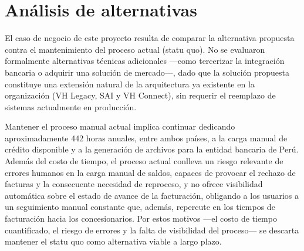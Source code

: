 \section{Análisis de alternativas}

El caso de negocio de este proyecto resulta de comparar la alternativa propuesta contra el mantenimiento del proceso actual (statu quo). No se evaluaron formalmente alternativas técnicas adicionales ---como tercerizar la integración bancaria o adquirir una solución de mercado---, dado que la solución propuesta constituye una extensión natural de la arquitectura ya existente en la organización (VH Legacy, SAI y VH Connect), sin requerir el reemplazo de sistemas actualmente en producción.

Mantener el proceso manual actual implica continuar dedicando aproximadamente 442 horas anuales, entre ambos países, a la carga manual de crédito disponible y a la generación de archivos para la entidad bancaria de Perú. Además del costo de tiempo, el proceso actual conlleva un riesgo relevante de errores humanos en la carga manual de saldos, capaces de provocar el rechazo de facturas y la consecuente necesidad de reproceso, y no ofrece visibilidad automática sobre el estado de avance de la facturación, obligando a los usuarios a un seguimiento manual constante que, además, repercute en los tiempos de facturación hacia los concesionarios. Por estos motivos ---el costo de tiempo cuantificado, el riesgo de errores y la falta de visibilidad del proceso--- se descarta mantener el statu quo como alternativa viable a largo plazo.
